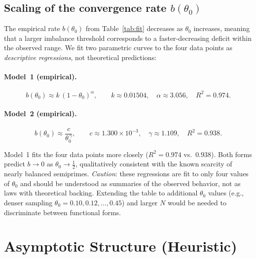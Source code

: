 \documentclass[11pt]{article}
\theoremstyle{definition}
\begin{document}
\subsection{Scaling of the convergence rate
  \texorpdfstring{$b(\theta_0)$}{b(theta0)}}
\label{sec:bscaling}

The empirical rate \(b(\theta_0)\) from Table~\ref{tab:fit} decreases as \(\theta_0\)
increases, meaning that a larger imbalance threshold corresponds to a faster-decreasing
deficit within the observed range.  We fit two parametric curves to the four data
points as \emph{descriptive regressions}, not theoretical predictions:

\paragraph{Model~1 (empirical).}
\[
  b(\theta_0) \approx k\,(1-\theta_0)^{\alpha},
  \qquad k \approx 0.01504,\quad \alpha \approx 3.056,\quad R^2 = 0.974.
\]

\paragraph{Model~2 (empirical).}
\[
  b(\theta_0) \approx \frac{c}{\theta_0^{\,\gamma}},
  \qquad c \approx 1.300\times 10^{-3},\quad \gamma \approx 1.109,\quad R^2 = 0.938.
\]

Model~1 fits the four data points more closely (\(R^2 = 0.974\) vs.\ \(0.938\)).
Both forms predict \(b \to 0\) as \(\theta_0 \to \tfrac{1}{2}\), qualitatively
consistent with the known scarcity of nearly balanced semiprimes.
\emph{Caution}: these regressions are fit to only four values of \(\theta_0\) and
should be understood as summaries of the observed behavior, not as laws with
theoretical backing.  Extending the table to additional \(\theta_0\) values (e.g.,
denser sampling \(\theta_0 = 0.10,0.12,\dots,0.45\)) and larger \(N\) would be needed
to discriminate between functional forms.

\section{Asymptotic Structure (Heuristic)}
\label{sec:heuristic}
\end{document}
